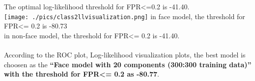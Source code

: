 \documentclass[fleqn]{article}
\begin{document}
The optimal log-likelihood threshold for FPR\textless=0.2 is -41.40.\\
\texttt{[image: ./pics/class2llvisualization.png]} \newline
in face model, the threshold for FPR<= 0.2 is -80.73\\
in non-face model, the threshold for FPR<= 0.2 is -41.40.\\\\
According to the ROC plot, Log-likelihood visualization plots, the best model is choosen as the \textbf{``Face model with 20 components (300:300 training data)'' with the threshold for FPR\textless= 0.2 as -80.77}.
\end{document}

